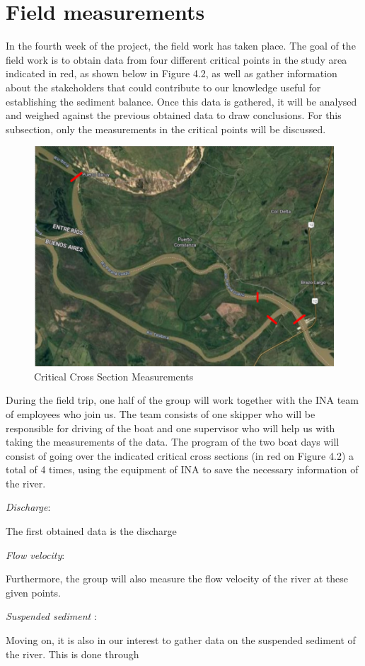 \section{Field measurements}
In the fourth week of the project, the field work has taken place. The goal of the field work is to obtain data from four different critical points in the study area indicated in red, as shown below in Figure 4.2, as well as gather information about the stakeholders that could contribute to our knowledge useful for establishing the sediment balance. Once this data is gathered, it will be analysed and weighed against the previous obtained data to draw conclusions. For this subsection, only the measurements in the critical points will be discussed.
\begin{figure}[H]
    \centering
    \includegraphics[width=0.5\linewidth]{figures/ch4/Critical measurement points.png}
    \caption{Critical Cross Section Measurements}
    \label{fig:placeholder}
\end{figure}
During the field trip, one half of the group will work together with the INA team of employees who join us. The team consists of one skipper who will be responsible for driving of the boat and one supervisor who will help us with taking the measurements of the data.
The program of the two boat days will consist of going over the indicated critical cross sections (in red on Figure 4.2) a total of 4 times, using the equipment of INA to save the necessary information of the river.

\textit{Discharge}:

The first obtained data is the discharge 

\textit{Flow velocity}:

Furthermore, the group will also measure the flow velocity of the river at these given points.

\textit{Suspended sediment }:

Moving on, it is also in our interest to gather data on the suspended sediment of the river. This is done through 

